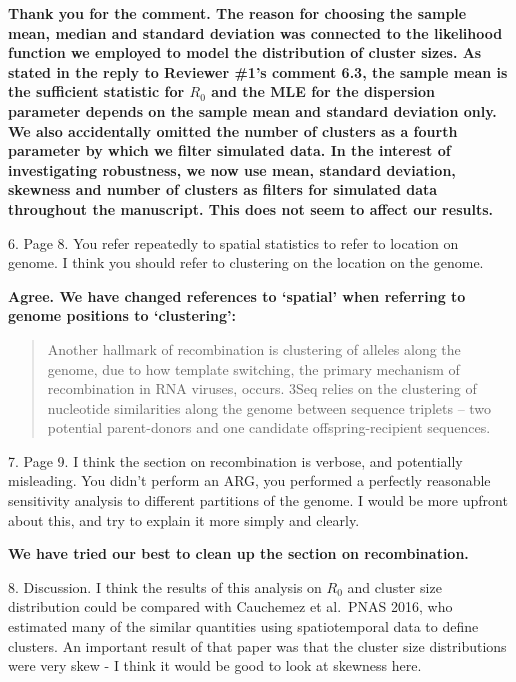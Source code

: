 \documentclass[11pt,oneside,letterpaper]{article}
\begin{document}
\textbf{Thank you for the comment.
The reason for choosing the sample mean, median and standard deviation was connected to the likelihood function we employed to model the distribution of cluster sizes.
As stated in the reply to Reviewer \#1's comment 6.3, the sample mean is the sufficient statistic for $R_0$ and the MLE for the dispersion parameter depends on the sample mean and standard deviation only.
We also accidentally omitted the number of clusters as a fourth parameter by which we filter simulated data.
In the interest of investigating robustness, we now use mean, standard deviation, skewness and number of clusters as filters for simulated data throughout the manuscript.
This does not seem to affect our results.}

6. Page 8. You refer repeatedly to spatial statistics to refer to location on genome. I think you should refer to clustering on the location on the genome.

\textbf{Agree. We have changed references to `spatial' when referring to genome positions to `clustering':}

\begin{quotation}
Another hallmark of recombination is clustering of alleles along the genome, due to how template switching, the primary mechanism of recombination in RNA viruses, occurs.
3Seq relies on the clustering of nucleotide similarities along the genome between sequence triplets -- two potential parent-donors and one candidate offspring-recipient sequences.
\end{quotation}

7. Page 9. I think the section on recombination is verbose, and potentially misleading. You didn't perform an ARG, you performed a perfectly reasonable sensitivity analysis to different partitions of the genome. I would be more upfront about this, and try to explain it more simply and clearly.

\textbf{We have tried our best to clean up the section on recombination.}

8. Discussion. I think the results of this analysis on $R_0$ and cluster size distribution could be compared with Cauchemez et al.\ PNAS 2016, who estimated many of the similar quantities using spatiotemporal data to define clusters. An important result of that paper was that the cluster size distributions were very skew - I think it would be good to look at skewness here.
\end{document}
